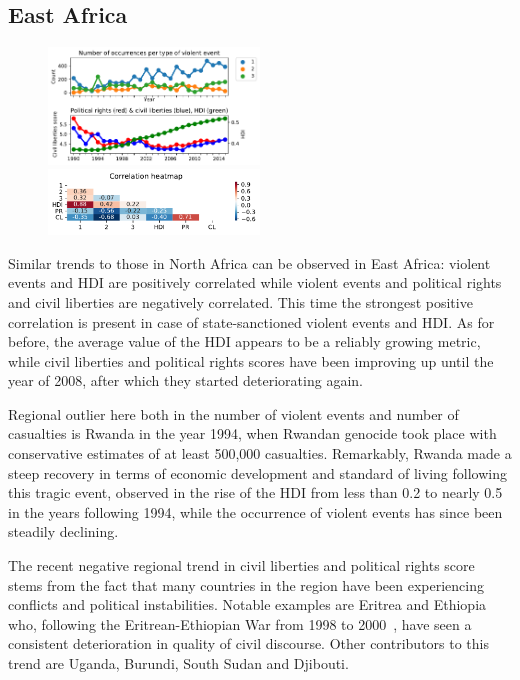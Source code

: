 \documentclass[a4paper,11pt]{article}
\begin{document}
\subsection{East Africa}
\begin{figure}[ht!]
    \includegraphics[width=0.50\textwidth]{images/ea.pdf}
    \includegraphics[width=0.50\textwidth]{images/ea_corr.pdf}
\end{figure}
Similar trends to those in North Africa can be observed in East Africa: violent events and HDI are positively correlated while violent events and political rights and civil liberties are negatively correlated. This time the strongest positive correlation is present in case of state-sanctioned violent events and HDI. As for before, the average value of the HDI appears to be a reliably growing metric, while civil liberties and political rights scores have been improving up until the year of 2008, after which they started deteriorating again.

Regional outlier here both in the number of violent events and number of casualties is Rwanda in the year 1994, when Rwandan genocide took place with conservative estimates of at least 500,000 casualties. Remarkably, Rwanda made a steep recovery in terms of economic development and standard of living following this tragic event, observed in the rise of the HDI from less than 0.2 to nearly 0.5 in the years following 1994, while the occurrence of violent events has since been steadily declining.

The recent negative regional trend in civil liberties and political rights score stems from the fact that many countries in the region have been experiencing conflicts and political instabilities. Notable examples are Eritrea and Ethiopia who, following the Eritrean-Ethiopian War from 1998 to 2000~\cite{wiki:xxx}, have seen a consistent deterioration in quality of civil discourse. Other contributors to this trend are Uganda, Burundi, South Sudan and Djibouti.
\end{document}
